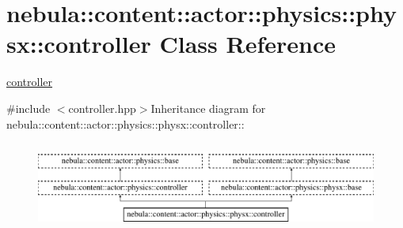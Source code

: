 \hypertarget{classnebula_1_1content_1_1actor_1_1physics_1_1physx_1_1controller}{
\section{nebula::content::actor::physics::physx::controller Class Reference}
\label{classnebula_1_1content_1_1actor_1_1physics_1_1physx_1_1controller}
}


\hyperlink{classnebula_1_1content_1_1actor_1_1physics_1_1physx_1_1controller}{controller}  


{\ttfamily \#include $<$controller.hpp$>$}Inheritance diagram for nebula::content::actor::physics::physx::controller::\begin{figure}[H]
\begin{center}
\leavevmode
\includegraphics[height=2.91667cm]{classnebula_1_1content_1_1actor_1_1physics_1_1physx_1_1controller}
\end{center}
\end{figure}
